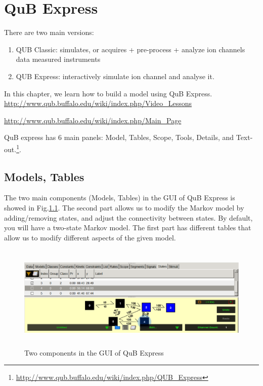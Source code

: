 \chapter{QuB Express}

There are two main versions:
\begin{enumerate}
  \item QUB Classic: simulates, or acquires + pre-process + analyze ion channels
  data measured instruments
  \item QUB Express: interactively simulate ion channel and analyse it.
\end{enumerate}

In this chapter, we learn how to build a model using QuB Express.
\url{http://www.qub.buffalo.edu/wiki/index.php/Video_Lessons}

\url{http://www.qub.buffalo.edu/wiki/index.php/Main_Page}

QuB express has 6 main panels: Model, Tables, Scope, Tools, Details, and
Text-out.\footnote{\url{http://www.qub.buffalo.edu/wiki/index.php/QUB_Express}}.

\section{Models, Tables}
\label{sec:model_tables}

The two main components (Models, Tables) in the GUI of QuB Express is showed in
Fig.\ref{fig:QuB_Express_01}. The second part allows us to modify the Markov
model by adding/removing states, and adjust the connectivity between states.
By default, you will have a two-state Markov model. The first part has different
tables that allow us to modify different aspects of the given model.

\begin{figure}[hbt]
  \centerline{\includegraphics[height=5cm,
    angle=0]{./images/QuB_Express_01.eps}}
  \caption{Two components in the GUI of QuB Express}
  \label{fig:QuB_Express_01}
\end{figure}

